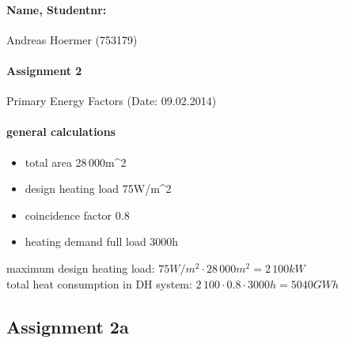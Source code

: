 \documentclass{article}
\begin{document}
	\paragraph{Name, Studentnr: }Andreas Hoermer (753179)
	\paragraph{Assignment 2}Primary Energy Factors (Date: 09.02.2014)
	\paragraph{general calculations}
		\begin{itemize}
			\item total area 28\,000m^2
			\item design heating load 75W/m^2
			\item coincidence factor 0.8
			\item heating demand full load 3000h
		\end{itemize}
		maximum design heating load: $75W/m^2\cdot 28\,000m^2 = 2\,100kW$\\
		total heat consumption in DH system: $2\,100\cdot 0.8\cdot 3000h = 5040GWh$\\

	\subsection*{Assignment 2a}
		
\end{document}
